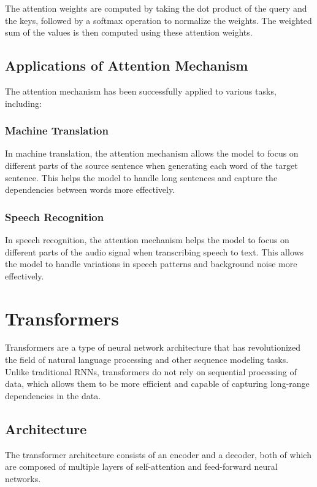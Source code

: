 \documentclass[12pt]{article}
\begin{document}
The attention weights are computed by taking the dot product of the query and the keys, followed by a softmax operation to normalize the weights. The weighted sum of the values is then computed using these attention weights.

\subsection{Applications of Attention Mechanism}
The attention mechanism has been successfully applied to various tasks, including:

\subsubsection{Machine Translation}
In machine translation, the attention mechanism allows the model to focus on different parts of the source sentence when generating each word of the target sentence. This helps the model to handle long sentences and capture the dependencies between words more effectively.

\subsubsection{Speech Recognition}
In speech recognition, the attention mechanism helps the model to focus on different parts of the audio signal when transcribing speech to text. This allows the model to handle variations in speech patterns and background noise more effectively.

\section{Transformers}
Transformers are a type of neural network architecture that has revolutionized the field of natural language processing and other sequence modeling tasks. Unlike traditional RNNs, transformers do not rely on sequential processing of data, which allows them to be more efficient and capable of capturing long-range dependencies in the data.

\subsection{Architecture}
The transformer architecture consists of an encoder and a decoder, both of which are composed of multiple layers of self-attention and feed-forward neural networks.
\end{document}
